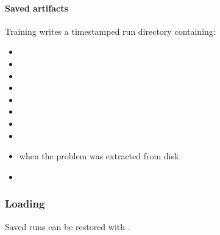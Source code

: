 \documentclass[letterpaper,10pt,english,openany,oneside]{sphinxmanual}
\begin{document}
\paragraph{Saved artifacts}
\label{\detokenize{api/package/execution/training:saved-artifacts}}
\sphinxAtStartPar
Training writes a timestamped run directory containing:
\begin{itemize}
\item {} 
\sphinxAtStartPar
{}

\item {} 
\sphinxAtStartPar
{}

\item {} 
\sphinxAtStartPar
{}

\item {} 
\sphinxAtStartPar
{}

\item {} 
\sphinxAtStartPar
{}

\item {} 
\sphinxAtStartPar
{}

\item {} 
\sphinxAtStartPar
{}

\item {} 
\sphinxAtStartPar
{}

\item {} 
\sphinxAtStartPar
{} when the problem was extracted from disk

\item {} 
\sphinxAtStartPar
{}

\end{itemize}

\sphinxstepscope


\subsubsection{Loading}
\label{\detokenize{api/package/execution/loading:loading}}\label{\detokenize{api/package/execution/loading::doc}}
\sphinxAtStartPar
Saved runs can be restored with {\hyperref[\detokenize{api/package/object:nlpoptnet.api.NLPOptNet.load}]{}}.
\end{document}

